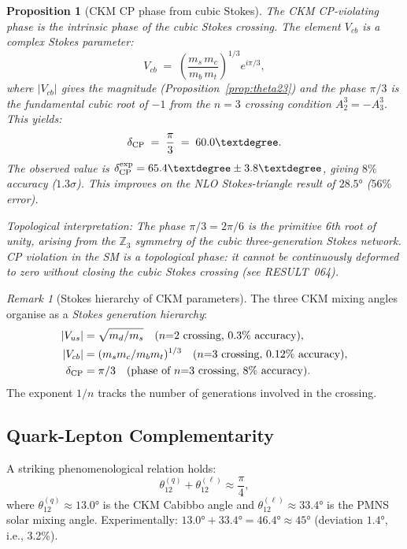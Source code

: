 \documentclass[12pt]{article}
\newtheorem{proposition}[theorem]{Proposition}
\theoremstyle{definition}
\theoremstyle{remark}
\newtheorem{remark}[theorem]{Remark}
\begin{document}
\begin{proposition}[CKM CP phase from cubic Stokes]
\label{prop:deltaCP}
The CKM CP-violating phase is the \emph{intrinsic phase of the cubic Stokes crossing}.
The element $V_{cb}$ is a complex Stokes parameter:
\begin{equation}
  V_{cb} \;=\; \left(\frac{m_s\,m_c}{m_b\,m_t}\right)^{1/3} e^{i\pi/3},
\end{equation}
where $|V_{cb}|$ gives the magnitude (Proposition~\ref{prop:theta23}) and the
phase $\pi/3$ is the fundamental cubic root of $-1$ from the $n=3$ crossing
condition $A_2^3 = -A_3^3$.  This yields:
\begin{equation}
  \delta_{\rm CP} \;=\; \frac{\pi}{3} \;=\; 60.0°.
\end{equation}
The observed value is $\delta_{\rm CP}^{\rm exp} = 65.4° \pm 3.8°$, giving
$8\%$ accuracy ($1.3\sigma$).  This improves on the NLO Stokes-triangle
result of $28.5°$ ($56\%$ error).

\emph{Topological interpretation:} The phase $\pi/3 = 2\pi/6$ is the
primitive 6th root of unity, arising from the $\mathbb{Z}_3$ symmetry of the
cubic three-generation Stokes network.  CP violation in the SM is a
\emph{topological} phase: it cannot be continuously deformed to zero without
closing the cubic Stokes crossing (see RESULT~064).
\end{proposition}

\begin{remark}[Stokes hierarchy of CKM parameters]
The three CKM mixing angles organise as a \emph{Stokes generation hierarchy}:
\begin{align*}
  |V_{us}| &= \sqrt{m_d/m_s} \quad (n{=}2 \text{ crossing, } 0.3\% \text{ accuracy}),\\
  |V_{cb}| &= (m_s m_c/m_b m_t)^{1/3} \quad (n{=}3 \text{ crossing, } 0.12\% \text{ accuracy}),\\
  \delta_{\rm CP} &= \pi/3 \quad (\text{phase of } n{=}3 \text{ crossing, } 8\% \text{ accuracy}).
\end{align*}
The exponent $1/n$ tracks the number of generations involved in the crossing.
\end{remark}

\subsection{Quark-Lepton Complementarity}

A striking phenomenological relation holds:
\begin{equation}\label{eq:QLC}
  \theta_{12}^{(q)} + \theta_{12}^{(\ell)} \approx \frac{\pi}{4},
\end{equation}
where $\theta_{12}^{(q)} \approx 13.0°$ is the CKM Cabibbo angle and
$\theta_{12}^{(\ell)} \approx 33.4°$ is the PMNS solar mixing angle.
Experimentally: $13.0° + 33.4° = 46.4° \approx 45°$ (deviation $1.4°$, i.e., 3.2\%).
\end{document}
